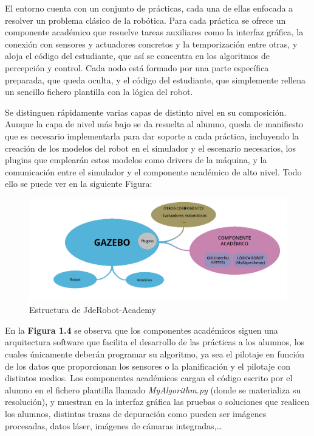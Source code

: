 El entorno cuenta con un conjunto de prácticas, cada una de ellas enfocada a resolver un problema clásico de la robótica. Para cada práctica se ofrece un componente académico que resuelve tareas auxiliares como la interfaz gráfica, la conexión con sensores y actuadores concretos y la temporización entre otras, y  aloja el código del estudiante, que así se concentra en los algoritmos de percepción y control. Cada nodo está formado por una parte específica preparada, que queda oculta, y el código del estudiante, que simplemente rellena un sencillo fichero plantilla con la lógica del robot.

Se distinguen rápidamente varias capas de distinto nivel en su composición. Aunque la capa de nivel más bajo se da resuelta al alumno, queda de manifiesto que es necesario implementarla para dar soporte a cada práctica, incluyendo  la creación de los modelos del robot en el simulador y el escenario necesarios, los plugins que emplearán estos modelos como drivers de la máquina, y la comunicación entre el simulador y el componente académico de alto nivel. Todo ello se puede ver en la siguiente Figura: 

\begin{figure}[H]
  \begin{center}
    \includegraphics[width=0.9\linewidth]{figures/estructura_jde.png}
		\caption{Estructura de JdeRobot-Academy}
		\label{fig.estructura}
		\end{center}
\end{figure}

En la \textbf{Figura 1.4} se observa que los componentes académicos siguen una arquitectura software que facilita el desarrollo de las prácticas a los alumnos, los cuales únicamente deberán programar su algoritmo, ya sea el pilotaje en función de los datos que proporcionan los sensores o la planificación y el pilotaje con distintos medios. Los componentes académicos cargan el código escrito por el alumno en el fichero plantilla llamado \textit{MyAlgorithm.py} (donde se materializa su resolución), y muestran en la interfaz  gráfica las pruebas o soluciones que realicen los alumnos, distintas trazas de depuración como pueden ser imágenes procesadas, datos láser, imágenes de cámaras integradas,…

